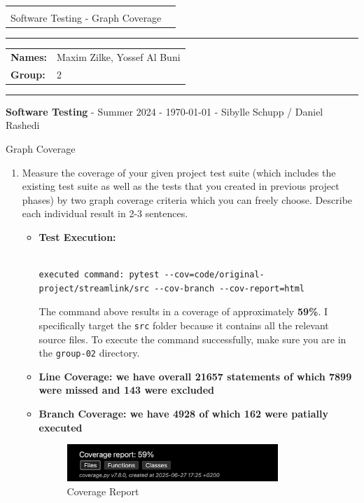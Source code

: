 \documentclass[a4paper]{scrreprt}
\newcommand{\baseinfo}[5]{
  \begin{center}
    \begin{tabular}{p{15cm}r}
      \vspace{-4.5pt}{ \Large \bfseries #1} & \multirow{2}{*}{} \\[0.4cm]
      #2 & \\[0.5cm]
    \end{tabular}
  \end{center}
  \vspace{-18pt}\hrule\vspace{6pt}
  \begin{tabular}{ll}
    \textbf{Names:} & #4\\
    \textbf{Group:} & #5\\
  \end{tabular}
  \vspace{4pt}\hrule\vspace{2pt}
  \footnotesize \textbf{Software Testing} \hfil - \hfil Summer 2024 \hfil - \hfil #3 \hfil - \hfil Sibylle Schupp / Daniel Rashedi \hfil \\
}
\newcounter{question}
\newcommand{\projectinfo}[4]{\baseinfo{Project Task 03 - Submission Sheet}{#1}{#2}{#3}{#4}}
\newcommand{\name}{Maxim Zilke, Yossef Al Buni}
\newcommand{\group}{2}
\begin{document}
\projectinfo{Software Testing - Graph Coverage\small}{\today}{\name}{\group}


\addtocounter{question}{2}

\begin{question}{Graph Coverage}
  \begin{enumerate}[topsep=0pt, leftmargin=*]
    \item Measure the coverage of your given project test suite (which includes the existing test suite as well as the tests that you created in previous project phases) by two graph coverage criteria which you can freely choose. Describe each individual result in 2-3 sentences.
          \begin{answer}

\begin{itemize}[leftmargin=1.5em]

\lstset{
  basicstyle=\ttfamily\small,
  breaklines=true,
  breakatwhitespace=false,
  showstringspaces=false,
  columns=flexible,
  frame=single,
}

\item \textbf{Test Execution:}
\begin{lstlisting}

executed command: pytest --cov=code/original-project/streamlink/src --cov-branch --cov-report=html
\end{lstlisting}

The command above results in a coverage of approximately \textbf{59\%}.  
I specifically target the \texttt{src} folder because it contains all the relevant source files.  
To execute the command successfully, make sure you are in the \texttt{group-02} directory.

\item \textbf{Line Coverage: we have overall 21657 statements of which 7899 were missed and 143 were excluded} 

\item \textbf{Branch Coverage: we have 4928 of which 162 were patially executed} 


\begin{figure}[htbp]
  \centering
  \includegraphics[width=0.8\textwidth]{coverage report.png}
  \caption{Coverage Report}
  \label{fig:meinbild}
\end{figure}


\end{itemize}
\end{answer}
\end{enumerate}
\end{question}
\end{document}
